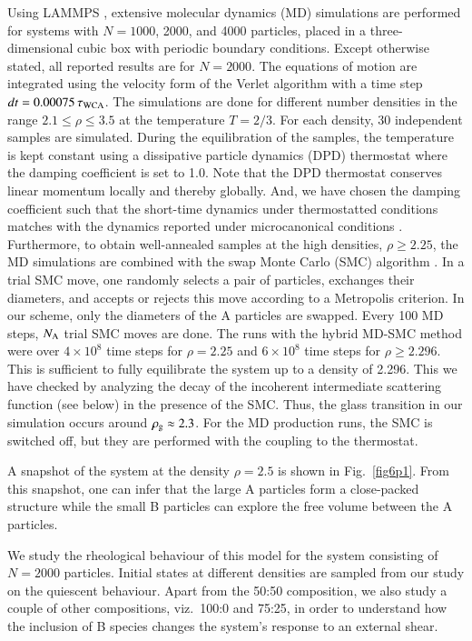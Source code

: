 Using LAMMPS \cite{plimpton1995}, extensive molecular dynamics (MD) simulations are performed for systems with $N = 1000$, 2000, and 4000 particles, placed in a three-dimensional cubic box with periodic boundary conditions. Except otherwise stated, all reported results are for $N=2000$. The equations of motion are integrated using the velocity form of the Verlet algorithm \cite{allen2017} with a time step $dt = 0.00075 \, \tau_{\rm WCA}$.  The simulations are done for different number densities in the range $2.1 \le \rho \le 3.5$ at the temperature $T = 2/3$. For each density, 30 independent samples are simulated.  During the equilibration of the samples, the temperature is kept constant using a dissipative particle dynamics (DPD) thermostat \cite{soddemann2003} where the damping coefficient is set to 1.0. {Note that the DPD thermostat conserves linear momentum locally and thereby globally. And, we have chosen the damping coefficient such that the short-time dynamics under thermostatted conditions matches with the dynamics reported under microcanonical conditions \cite{horbach2009}. Furthermore, to obtain well-annealed samples at} the high densities, $\rho \ge 2.25$, the MD simulations are combined with the swap Monte Carlo (SMC) algorithm \cite{grigera2001, berthier2019}.  In a trial SMC move, one randomly selects a pair of particles, exchanges their diameters, and accepts or rejects this move according to a Metropolis criterion. In our scheme, only the diameters of the A particles are swapped. Every 100 MD steps, $N_{\rm A}$ trial SMC moves are done. The runs with the hybrid MD-SMC method were over $4 \times 10^8$ time steps for $\rho = 2.25$ and $6 \times 10^8$ time steps for $\rho \ge 2.296$. This is sufficient to fully equilibrate the system up to a density of 2.296. This we have checked by analyzing the decay of the incoherent intermediate scattering function (see below) in the presence of the SMC. Thus, the glass transition in our simulation occurs around $\rho_{\rm g} \approx 2.3$. For the MD production runs, the SMC is switched off, but they are performed with the coupling to the thermostat.

A snapshot of the system at the density $\rho = 2.5$ is shown in Fig.~\ref{fig6p1}. From this snapshot, one can infer that the large A particles form a close-packed structure while the small B particles can explore the free volume between the A particles.


We study the rheological behaviour of this model for the system consisting of $N = 2000$ particles. Initial states at different densities are sampled from our study on the quiescent behaviour. Apart from the 50:50 composition, we also study a couple of other compositions, viz.~100:0 and 75:25, in order to understand how the inclusion of B species changes the system's response to an external shear.

